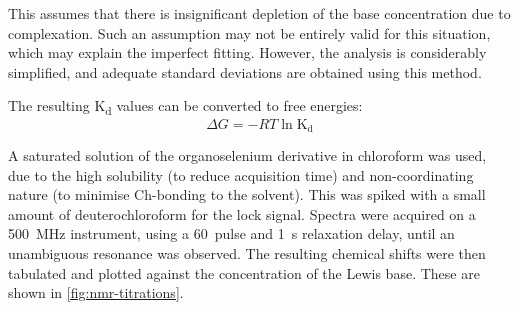 \begin{refsection}
This assumes that there is insignificant depletion of the base concentration due to complexation.\autocite{Thordarson2011}
Such an assumption may not be entirely valid for this situation, which may explain the imperfect fitting.
However, the analysis is considerably simplified, and adequate standard deviations are obtained using this method.

The resulting K\textsubscript{d} values can be converted to free energies:
\begin{equation}
    \Delta G = -RT \ln{\mathrm{K_d}}
\end{equation}

A saturated solution of the organoselenium derivative in chloroform was used, due to the high solubility (to reduce acquisition time) and non-coordinating nature (to minimise Ch-bonding to the solvent).
This was spiked with a small amount of deuterochloroform for the lock signal.
Spectra were acquired on a 500~MHz instrument, using a 60\degree~pulse and 1~s relaxation delay, until an unambiguous  resonance was observed.
The resulting chemical shifts were then tabulated and plotted against the concentration of the Lewis base.
These are shown in \cref{fig:nmr-titrations}.


\end{refsection}
